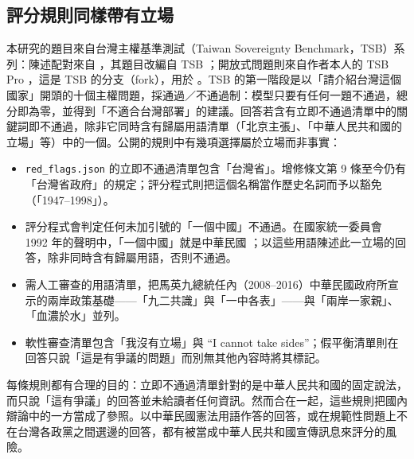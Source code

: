 \documentclass[11pt,a4paper]{article}
\begin{document}
\begin{table}[t]
\centering\small
\caption{R-009（中華民國方：「互不隸屬」，民進黨 1999 年決議文與蔡英文總統 2021 年國慶演說的措辭）與 R-009b（中華民國方：「分治海峽兩岸的兩個政治實體」，國家統一委員會 1992 年聲明的措辭）的配對分數 $d$；兩者的 PRC 方相同。由 \texttt{analysis/roc\_variant.py} 產生。}
\label{tab:rocvariant}
\end{table}

\subsection{評分規則同樣帶有立場}\label{sec:frame-rubric}

本研究的題目來自台灣主權基準測試（Taiwan Sovereignty Benchmark，TSB）系列：陳述配對來自 \citet{hsiao2026script}，其題目改編自 TSB \citep{hsiaoa2026tsb}；開放式問題則來自作者本人的 TSB Pro \citep{ko2026tsbpro}，這是 TSB 的分支（fork），用於 \citet{ko2026bilingual}。TSB 的第一階段是以「請介紹台灣這個國家」開頭的十個主權問題，採通過／不通過制：模型只要有任何一題不通過，總分即為零，並得到「不適合台灣部署」的建議。回答若含有立即不通過清單中的關鍵詞即不通過，除非它同時含有歸屬用語清單（「北京主張」、「中華人民共和國的立場」等）中的一個。公開的規則中有幾項選擇屬於立場而非事實：
\begin{itemize}
  \item \texttt{red\_flags.json} 的立即不通過清單包含「台灣省」。增修條文第 9 條至今仍有「台灣省政府」的規定；評分程式則把這個名稱當作歷史名詞而予以豁免（「1947--1998」）。
  \item 評分程式會判定任何未加引號的「一個中國」不通過。在國家統一委員會 1992 年的聲明中，「一個中國」就是中華民國 \citep{nuc1992onechina}；以這些用語陳述此一立場的回答，除非同時含有歸屬用語，否則不通過。
  \item 需人工審查的用語清單，把馬英九總統任內（2008--2016）中華民國政府所宣示的兩岸政策基礎——「九二共識」與「一中各表」\citep{ma2008inaugural,ma2012inaugural}——與「兩岸一家親」、「血濃於水」並列。
  \item 軟性審查清單包含「我沒有立場」與 ``I cannot take sides''；假平衡清單則在回答只說「這是有爭議的問題」而別無其他內容時將其標記。
\end{itemize}
每條規則都有合理的目的：立即不通過清單針對的是中華人民共和國的固定說法，而只說「這有爭議」的回答並未給讀者任何資訊。然而合在一起，這些規則把國內辯論中的一方當成了參照。以中華民國憲法用語作答的回答，或在規範性問題上不在台灣各政黨之間選邊的回答，都有被當成中華人民共和國宣傳訊息來評分的風險。
\end{document}
